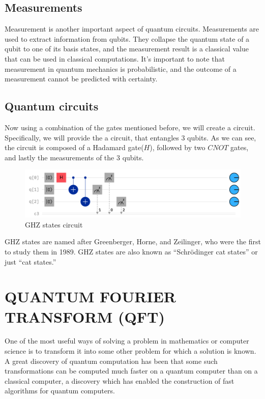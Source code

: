 \documentclass[inscr,ack,preface]{diphdthesis}
\begin{document}
\section{Measurements}

Measurement is another important aspect of quantum circuits. Measurements are used to extract information from qubits. They collapse the quantum state of a qubit to one of its basis states, and the measurement result is a classical value that can be used in classical computations. It's important to note that measurement in quantum mechanics is probabilistic, and the outcome of a measurement cannot be predicted with certainty.

\section{Quantum circuits}

Now using a combination of the gates mentioned before, we will create a circuit. Specifically, we will provide the a circuit, that entangles 3 qubits. As we can see, the circuit is composed of a Hadamard gate($H$), followed by two $CNOT$ gates, and lastly the measurements of the 3 qubits. \cite{ibm}
\begin{figure}[ht]
    \includegraphics[width=1\textwidth]{ghz.png}
    \caption{GHZ states circuit}
    \label{fig:enter-label}
\end{figure}

GHZ states are named after Greenberger, Horne, and Zeilinger, who were the first to study them in 1989. GHZ states are also known as “Schrödinger cat states” or just “cat states.” \cite{ghz_ibm}

\chapter{QUANTUM FOURIER TRANSFORM (QFT)}

One of the most useful ways of solving a problem in mathematics or computer science is to transform it into some other problem for which a solution is known.  A great discovery of quantum computation has been that some such transformations can be computed much faster on a quantum computer than on a classical computer, a discovery which has enabled the construction of fast algorithms for quantum computers.
\end{document}

